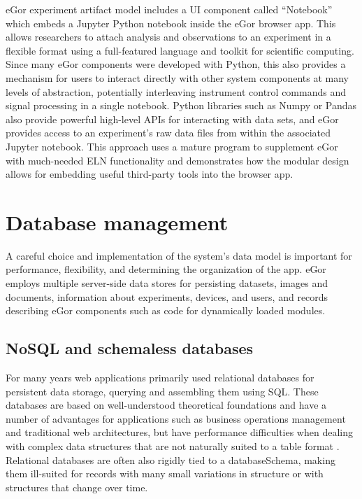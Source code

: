 \documentclass[../thesis]{subfiles}
\begin{document}
eGor experiment artifact model includes a \gls{UI} component called
``Notebook'' which embeds a Jupyter Python notebook inside the eGor
browser app. This allows researchers to attach analysis and
observations to an experiment in a flexible format using a
full-featured language and toolkit for scientific computing. Since
many eGor components were developed with Python, this also provides a
mechanism for users to interact directly with other system components
at many levels of abstraction, potentially interleaving instrument
control commands and signal processing in a single notebook. Python
libraries such as Numpy \cite{Numpy} or Pandas \cite{Pandas} also
provide powerful high-level APIs for interacting with data sets, and
eGor provides access to an experiment's raw data files from within the
associated Jupyter notebook. This approach uses a mature program to supplement
eGor with much-needed \gls{ELN} functionality and demonstrates
how the modular design allows for embedding useful third-party tools
into the browser app.



\section{Database management}
A careful choice and implementation of the system's data model is
important for performance, flexibility, and determining the
organization of the app. eGor employs multiple server-side data stores
for persisting datasets, images and documents, information about
experiments, devices, and users, and records describing eGor
components such as code for dynamically loaded modules.

\subsection{NoSQL and schemaless databases}
For many years web applications primarily used relational databases
for persistent data storage, querying and assembling them using
\gls{SQL}. These databases are based on well-understood theoretical
foundations and have a number of advantages for applications such as
business operations management and traditional web architectures, but
have performance difficulties when dealing with complex data
structures that are not naturally suited to a table format
\cite{Mohan:2013:HRI:2452376.2452378}. Relational databases are often
also rigidly tied to a \gls{databaseSchema}, making them ill-suited
for records with many small variations in structure or with structures
that change over time.
\end{document}
